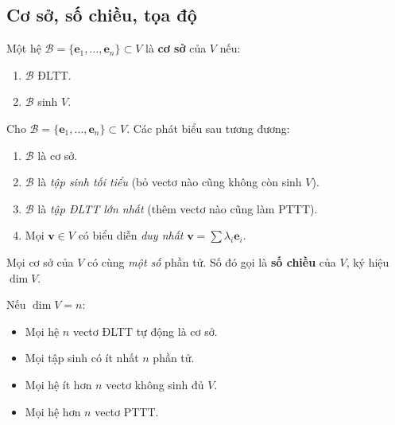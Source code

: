 \documentclass[12pt,a4paper]{article}
\begin{document}
\subsection{Cơ sở, số chiều, tọa độ}

\begin{dinhnghia}
  Một hệ $\mathcal{B} = \{\mathbf{e}_1, \ldots, \mathbf{e}_n\} \subset V$ là \textbf{cơ sở} của $V$ nếu:
  \begin{enumerate}
    \item $\mathcal{B}$ ĐLTT.
    \item $\mathcal{B}$ sinh $V$.
  \end{enumerate}
\end{dinhnghia}

\begin{dinhly}[title={Bốn phát biểu tương đương cho cơ sở}]
Cho $\mathcal{B} = \{\mathbf{e}_1, \ldots, \mathbf{e}_n\} \subset V$. Các phát biểu sau tương đương:
\begin{enumerate}
  \item $\mathcal{B}$ là cơ sở.
  \item $\mathcal{B}$ là \emph{tập sinh tối tiểu} (bỏ vectơ nào cũng không còn sinh $V$).
  \item $\mathcal{B}$ là \emph{tập ĐLTT lớn nhất} (thêm vectơ nào cũng làm PTTT).
  \item Mọi $\mathbf{v} \in V$ có biểu diễn \emph{duy nhất} $\mathbf{v} = \sum \lambda_i \mathbf{e}_i$.
\end{enumerate}
\end{dinhly}

\begin{dinhly}[title={Số chiều}]
Mọi cơ sở của $V$ có cùng \emph{một số} phần tử. Số đó gọi là \textbf{số chiều} của $V$, ký hiệu $\dim V$.

Nếu $\dim V = n$:
\begin{itemize}
  \item Mọi hệ $n$ vectơ ĐLTT tự động là cơ sở.
  \item Mọi tập sinh có ít nhất $n$ phần tử.
  \item Mọi hệ ít hơn $n$ vectơ không sinh đủ $V$.
  \item Mọi hệ hơn $n$ vectơ PTTT.
\end{itemize}
\end{dinhly}
\end{document}
